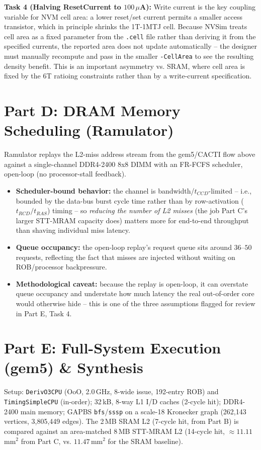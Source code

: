 \documentclass[11pt]{article}
\begin{document}
\textbf{Task 4 (Halving ResetCurrent to $100\,\mu$A):} Write current is the key coupling variable for NVM cell area: a lower reset/set current permits a smaller access transistor, which in principle shrinks the 1T-1MTJ cell. Because NVSim treats cell area as a fixed parameter from the \texttt{.cell} file rather than deriving it from the specified currents, the reported area does not update automatically -- the designer must manually recompute and pass in the smaller \texttt{-CellArea} to see the resulting density benefit. This is an important asymmetry vs. SRAM, where cell area is fixed by the 6T ratioing constraints rather than by a write-current specification.

\section{Part D: DRAM Memory Scheduling (Ramulator)}
Ramulator replays the L2-miss address stream from the gem5/CACTI flow above against a single-channel DDR4-2400 8x8 DIMM with an FR-FCFS scheduler, open-loop (no processor-stall feedback).

\begin{itemize}
    \item \textbf{Scheduler-bound behavior:} the channel is bandwidth/$t_{CCD}$-limited -- i.e., bounded by the data-bus burst cycle time rather than by row-activation ($t_{RCD}/t_{RAS}$) timing -- so \emph{reducing the number of L2 misses} (the job Part C's larger STT-MRAM capacity does) matters more for end-to-end throughput than shaving individual miss latency.
    \item \textbf{Queue occupancy:} the open-loop replay's request queue sits around $36$--$50$ requests, reflecting the fact that misses are injected without waiting on ROB/processor backpressure.
    \item \textbf{Methodological caveat:} because the replay is open-loop, it can overstate queue occupancy and understate how much latency the real out-of-order core would otherwise hide -- this is one of the three assumptions flagged for review in Part E, Task 4.
\end{itemize}

\section{Part E: Full-System Execution (gem5) \& Synthesis}
Setup: \texttt{DerivO3CPU} (OoO, 2.0\,GHz, 8-wide issue, 192-entry ROB) and \texttt{TimingSimpleCPU} (in-order); 32\,kB, 8-way L1 I/D caches (2-cycle hit); DDR4-2400 main memory; GAPBS \texttt{bfs}/\texttt{sssp} on a scale-18 Kronecker graph (262{,}143 vertices, 3{,}805{,}449 edges). The 2\,MB SRAM L2 (7-cycle hit, from Part B) is compared against an area-matched 8\,MB STT-MRAM L2 (14-cycle hit, $\approx11.11$\,mm$^2$ from Part C, vs. $11.47$\,mm$^2$ for the SRAM baseline).
\end{document}
